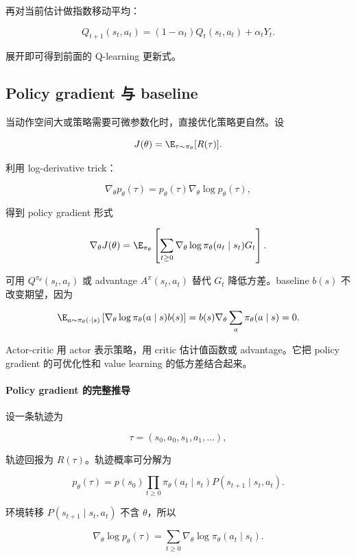 再对当前估计做指数移动平均：

\[
  Q_{t+1}(s_t,a_t)
  =
  (1-\alpha_t)Q_t(s_t,a_t)+\alpha_tY_t.
\]

展开即可得到前面的 Q-learning 更新式。

\subsection{Policy gradient 与 baseline}


当动作空间大或策略需要可微参数化时，直接优化策略更自然。设

\[
  J(\theta)=\E_{\tau\sim\pi_\theta}[R(\tau)].
\]

利用 log-derivative trick：

\[
  \nabla_\theta p_\theta(\tau)
  =
  p_\theta(\tau)\nabla_\theta\log p_\theta(\tau),
\]

得到 policy gradient 形式

\[
  \nabla_\theta J(\theta)
  =
  \E_{\pi_\theta}
  \left[
    \sum_{t\ge0}
    \nabla_\theta\log\pi_\theta(a_t\mid s_t)
    G_t
  \right].
\]

可用 \(Q^{\pi_\theta}(s_t,a_t)\) 或 advantage \(A^\pi(s_t,a_t)\) 替代 \(G_t\) 降低方差。baseline \(b(s)\) 不改变期望，因为

\[
  \E_{a\sim\pi_\theta(\cdot\mid s)}
  \left[
    \nabla_\theta\log\pi_\theta(a\mid s)b(s)
  \right]
  =
  b(s)\nabla_\theta\sum_a\pi_\theta(a\mid s)
  =
  0.
\]

Actor-critic 用 actor 表示策略，用 critic 估计值函数或 advantage。它把 policy gradient 的可优化性和 value learning 的低方差结合起来。

\paragraph{Policy gradient 的完整推导}

设一条轨迹为

\[
  \tau=(s_0,a_0,s_1,a_1,\ldots),
\]

轨迹回报为 \(R(\tau)\)。轨迹概率可分解为

\[
  p_\theta(\tau)
  =
  p(s_0)
  \prod_{t\ge0}
  \pi_\theta(a_t\mid s_t)
  P(s_{t+1}\mid s_t,a_t).
\]

环境转移 \(P(s_{t+1}\mid s_t,a_t)\) 不含 \(\theta\)，所以

\[
  \nabla_\theta\log p_\theta(\tau)
  =
  \sum_{t\ge0}
  \nabla_\theta\log\pi_\theta(a_t\mid s_t).
\]


